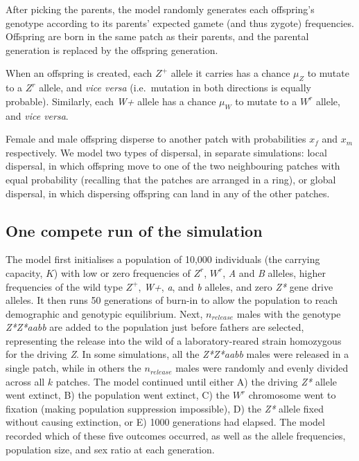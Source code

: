 \documentclass[]{rsos}%
\begin{document}
After picking the parents, the model randomly generates each offspring's
genotype according to its parents' expected gamete (and thus zygote)
frequencies. Offspring are born in the same patch as their parents, and
the parental generation is replaced by the offspring generation.

When an offspring is created, each \(Z^+\) allele it carries has a
chance \(\mu_Z\) to mutate to a \(Z^r\) allele, and \emph{vice versa}
(i.e.~mutation in both directions is equally probable). Similarly, each
\emph{W+} allele has a chance \(\mu_W\) to mutate to a \(W^r\) allele,
and \emph{vice versa}.

Female and male offspring disperse to another patch with probabilities
\(x_f\) and \(x_m\) respectively. We model two types of dispersal, in
separate simulations: local dispersal, in which offspring move to one of
the two neighbouring patches with equal probability (recalling that the
patches are arranged in a ring), or global dispersal, in which
dispersing offspring can land in any of the other patches.

\hypertarget{one-compete-run-of-the-simulation}{%
\subsection{One compete run of the
simulation}\label{one-compete-run-of-the-simulation}}

The model first initialises a population of 10,000 individuals (the
carrying capacity, \(K\)) with low or zero frequencies of \(Z^r\),
\(W^r\), \emph{A} and \emph{B} alleles, higher frequencies of the wild
type \(Z^+\), \emph{W+}, \emph{a}, and \emph{b} alleles, and zero
\emph{Z*} gene drive alleles. It then runs 50 generations of burn-in to
allow the population to reach demographic and genotypic equilibrium.
Next, \(n_{release}\) males with the genotype \emph{Z*Z*aabb} are added
to the population just before fathers are selected, representing the
release into the wild of a laboratory-reared strain homozygous for the
driving \emph{Z}. In some simulations, all the \emph{Z*Z*aabb} males
were released in a single patch, while in others the \(n_{release}\)
males were randomly and evenly divided across all \(k\) patches. The
model continued until either A) the driving \emph{Z*} allele went
extinct, B) the population went extinct, C) the \(W^r\) chromosome went
to fixation (making population suppression impossible), D) the \emph{Z*}
allele fixed without causing extinction, or E) 1000 generations had
elapsed. The model recorded which of these five outcomes occurred, as
well as the allele frequencies, population size, and sex ratio at each
generation.
\end{document}
